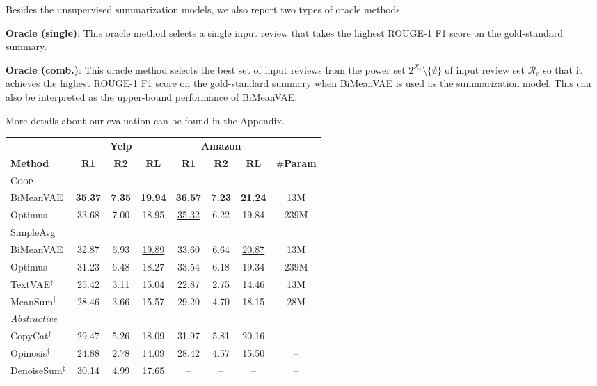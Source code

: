 \documentclass[11pt]{article}
\newcommand{\aggname}{\textsc{Coop}}
\newcommand{\name}{\mbox{\sc BiMeanVAE}}
\newcommand{\simpleavg}{\mbox{SimpleAvg}}
\newcommand{\yelp}{\mbox{\bf Yelp}}
\newcommand{\amazon}{\mbox{\bf Amazon}}
\newcommand{\hl}[1]{#1}
\begin{document}
Besides the unsupervised summarization models, we also report \hl{two types of oracle methods.}

\noindent
{\bf Oracle (single)}: This oracle method selects a single input review that takes the highest ROUGE-1 F1 score on the gold-standard summary.

\noindent
{\bf Oracle (comb.)}: This oracle method selects the best set of input reviews from the power set $2^{\mathcal{R}_e}\setminus \{\emptyset\}$ of input review set $\mathcal{R}_e$ so that it achieves the highest ROUGE-1 F1 score on the gold-standard summary when \name{} is used as the summarization model. This can also be interpreted as the upper-bound performance of \name{}.

\hl{More details about our evaluation can be found in the Appendix.}
\begin{table*}[t]
\centering
\small
\begin{tabular}{lccccccc}\toprule
& \multicolumn{3}{c}{\yelp} & \multicolumn{3}{c}{\amazon} & \\
\textbf{Method} & \textbf{R1} & \textbf{R2} & \textbf{RL} & \textbf{R1} & \textbf{R2} & \textbf{RL} & \#\textbf{Param} \\\midrule
\aggname\\
\quad \name &\textbf{35.37} & \textbf{7.35} & \textbf{19.94} & \textbf{36.57} & \textbf{7.23} & \textbf{21.24} & 13M \\
\quad Optimus & 33.68 & 7.00 & 18.95 & \underline{35.32} & 6.22 & 19.84 & 239M \\\midrule
\simpleavg \\
\quad \name & 32.87 & 6.93 & \underline{19.89} & 33.60 & 6.64 & \underline{20.87} & 13M \\
\quad Optimus & 31.23 & 6.48 & 18.27 & 33.54 & 6.18 & 19.34 & 239M \\
\quad TextVAE$^\dagger$ & 25.42 & 3.11 & 15.04 & 22.87 & 2.75 & 14.46 & 13M\\
\quad MeanSum$^\dagger$ & 28.46 & 3.66 & 15.57 & 29.20 & 4.70 & 18.15 & 28M\\\midrule
\textit{Abstractive}\\
\quad CopyCat$^\dagger$ & 29.47 & 5.26 & 18.09 & 31.97 & 5.81 & 20.16 & -- \\
\quad Opinosis$^\dagger$ & 24.88 & 2.78 & 14.09 & 28.42 & 4.57 & 15.50 & --\\
\quad DenoiseSum$^\ddagger$ & 30.14 & 4.99 & 17.65 & -- & -- & -- & -- \\


\end{tabular}
\end{table*}
\end{document}
